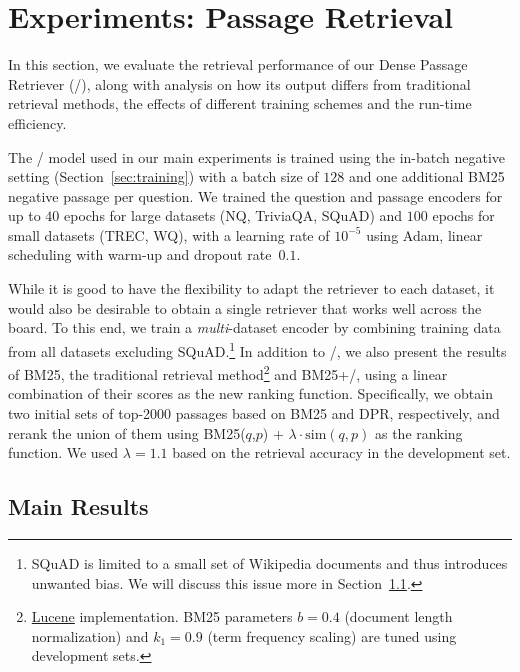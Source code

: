 

\section{Experiments: Passage Retrieval}
\label{sec:exp-psg}

In this section, we evaluate the retrieval performance of our Dense Passage Retriever (\model/), along with analysis on
how its output differs from traditional retrieval methods, the effects of different training schemes and the run-time efficiency.

The \model/ model used in our main experiments is trained using the in-batch negative setting (Section~\ref{sec:training}) with a batch size of $128$ and one additional BM25 negative passage per question.
We trained the question and passage encoders for up to $40$ epochs for large datasets (NQ, TriviaQA, SQuAD) and $100$ epochs for small datasets (TREC, WQ), with a learning rate of $10^{-5}$ using Adam, linear scheduling with warm-up and dropout rate~$0.1$.

While it is good to have the flexibility to adapt the retriever to each dataset, it would also be desirable to obtain a single retriever that works well across the board. To this end, we train a \emph{multi}-dataset encoder by combining training data from all datasets excluding SQuAD.\footnote{SQuAD is limited to a small set of Wikipedia documents and thus introduces unwanted bias. We will discuss this issue more in Section~\ref{sec:retrieval_main_results}.} %
In addition to \model/, we also present the results of BM25, the traditional retrieval method\footnote{\href{https://lucene.apache.org/}{Lucene} implementation. BM25 parameters $b=0.4$ (document length normalization) and $k_1=0.9$ (term frequency scaling) are tuned using development sets.} and BM25+\model/, using a linear combination of their scores as the new ranking function. 
Specifically, we obtain two initial sets of top-2000 passages based on BM25 and DPR, respectively, and rerank the union of them using BM25($q$,$p$) + $\lambda \cdot \mathrm{sim}(q,p)$ as the ranking function. We used $\lambda=1.1$ based on the retrieval accuracy in the development set.





\subsection{Main Results}
\label{sec:retrieval_main_results}

